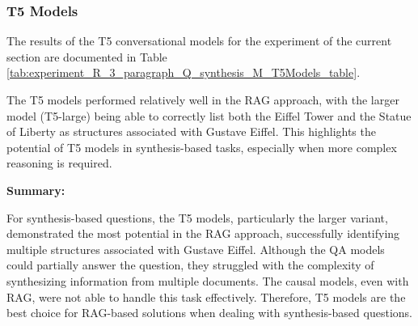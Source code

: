 \documentclass{wseas}
\begin{document}
\subsubsection{T5 Models}


The results of the T5 conversational models for the experiment of the current section
are documented in Table \ref{tab:experiment_R_3_paragraph_Q_synthesis_M_T5Models_table}.

The T5 models performed relatively well in the RAG approach, with the
larger model (T5-large) being able to correctly list both the Eiffel
Tower and the Statue of Liberty as structures associated with Gustave
Eiffel. This highlights the potential of T5 models in synthesis-based
tasks, especially when more complex reasoning is required.

\textbf{Summary:}

For synthesis-based questions, the T5 models, particularly the larger
variant, demonstrated the most potential in the RAG approach,
successfully identifying multiple structures associated with Gustave
Eiffel. Although the QA models could partially answer the question, they
struggled with the complexity of synthesizing information from multiple
documents. The causal models, even with RAG, were not able to handle
this task effectively. Therefore, T5 models are the best choice for
RAG-based solutions when dealing with synthesis-based questions.
\end{document}
